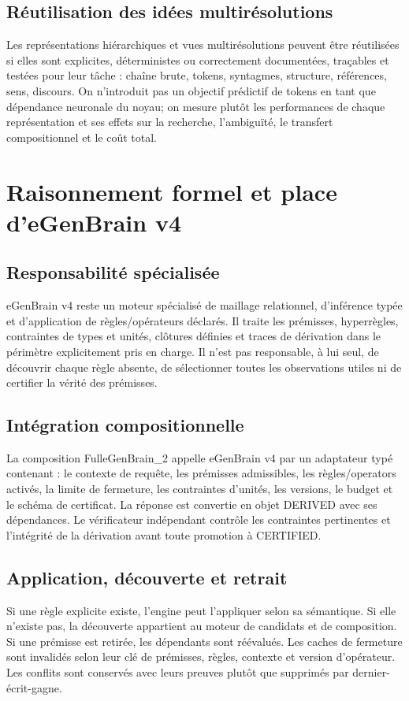\documentclass[11pt,a4paper]{article}
\newcommand{\State}[1]{\textsf{#1}}
\begin{document}
\subsection{Réutilisation des idées multirésolutions}
Les représentations hiérarchiques et vues multirésolutions peuvent être réutilisées si elles sont explicites, déterministes ou correctement documentées, traçables et testées pour leur tâche : chaîne brute, tokens, syntagmes, structure, références, sens, discours. On n'introduit pas un objectif prédictif de tokens en tant que dépendance neuronale du noyau; on mesure plutôt les performances de chaque représentation et ses effets sur la recherche, l'ambiguïté, le transfert compositionnel et le coût total.

\section{Raisonnement formel et place d'eGenBrain v4}
\subsection{Responsabilité spécialisée}
eGenBrain v4 reste un moteur spécialisé de maillage relationnel, d'inférence typée et d'application de règles/opérateurs déclarés. Il traite les prémisses, hyperrègles, contraintes de types et unités, clôtures définies et traces de dérivation dans le périmètre explicitement pris en charge. Il n'est pas responsable, à lui seul, de découvrir chaque règle absente, de sélectionner toutes les observations utiles ni de certifier la vérité des prémisses.

\subsection{Intégration compositionnelle}
La composition FulleGenBrain\_2 appelle eGenBrain v4 par un adaptateur typé contenant : le contexte de requête, les prémisses admissibles, les règles/operators activés, la limite de fermeture, les contraintes d'unités, les versions, le budget et le schéma de certificat. La réponse est convertie en objet \State{DERIVED} avec ses dépendances. Le vérificateur indépendant contrôle les contraintes pertinentes et l'intégrité de la dérivation avant toute promotion à \State{CERTIFIED}.

\subsection{Application, découverte et retrait}
Si une règle explicite existe, l'engine peut l'appliquer selon sa sémantique. Si elle n'existe pas, la découverte appartient au moteur de candidats et de composition. Si une prémisse est retirée, les dépendants sont réévalués. Les caches de fermeture sont invalidés selon leur clé de prémisses, règles, contexte et version d'opérateur. Les conflits sont conservés avec leurs preuves plutôt que supprimés par dernier-écrit-gagne.
\end{document}
